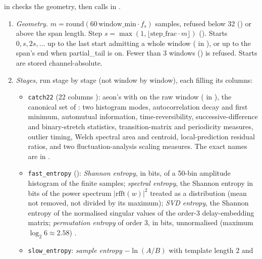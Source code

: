  in  checks the geometry, then calls
 in .
\begin{enumerate}
\item \emph{Geometry.} $m = \mathrm{round}(60\,\text{window\_min}\cdot f_s)$ samples, refused
  below 32 () or above the span length. Step
  $s = \max(1, \lfloor \text{step\_frac}\cdot m\rfloor)$ (). Starts
  $0, s, 2s, \dots$ up to the last start admitting a whole window
  ( in ), or up to the span's end when
  partial\_tail is on. Fewer than 3 windows () is refused. Starts are
  stored channel-absolute.
\item \emph{Stages}, run stage by stage (not window by window), each filling its columns:
  \begin{itemize}
  \item \texttt{catch22} (22 columns ): aeon's  with
     on the raw window ( in
    ), the canonical set of
    \citet{lubba2019catch22}: two histogram modes, autocorrelation decay and first minimum,
    automutual information, time-reversibility, successive-difference and binary-stretch
    statistics, transition-matrix and periodicity measures, outlier timing, Welch spectral
    area and centroid, local-prediction residual ratios, and two fluctuation-analysis
    scaling measures. The exact names are in .
  \item \texttt{fast\_entropy} ():
    \emph{Shannon entropy}, in bits, of a 50-bin amplitude histogram of the finite samples;
    \emph{spectral entropy}, the Shannon entropy in bits of the power spectrum
    $|\mathrm{rfft}(w)|^2$ treated as a distribution (mean not removed, not divided by its
    maximum); \emph{SVD entropy}, the Shannon entropy of the normalised singular values of the
    order-3 delay-embedding matrix; \emph{permutation entropy} of order 3, in bits, unnormalised
    (maximum $\log_2 6 \approx 2.58$) \citep{bandt2002permutation}.
  \item \texttt{slow\_entropy}: \emph{sample entropy} $-\ln(A/B)$ with template length 2 and

\end{itemize}
\end{enumerate}
